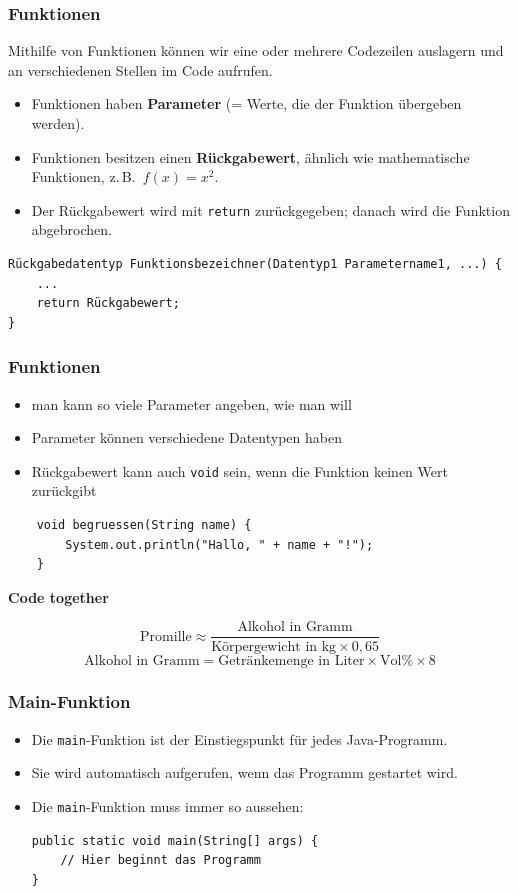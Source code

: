 \documentclass{../../presentation}
\begin{document}
\begin{frame}[fragile]
    \frametitle{Funktionen}
    Mithilfe von Funktionen können wir eine oder mehrere Codezeilen auslagern und an verschiedenen Stellen im Code aufrufen.
    \begin{itemize}
        \item Funktionen haben \textbf{Parameter} (= Werte, die der Funktion übergeben werden).
        \item Funktionen besitzen einen \textbf{Rückgabewert}, ähnlich wie mathematische Funktionen, z.\,B.\ $f(x) = x^2$.
        \item Der Rückgabewert wird mit \texttt{return} zurückgegeben; danach wird die Funktion abgebrochen.
    \end{itemize}
    \begin{verbatim}
Rückgabedatentyp Funktionsbezeichner(Datentyp1 Parametername1, ...) {
    ...
    return Rückgabewert;
}
\end{verbatim}
\end{frame}

\begin{frame}[fragile]
    \frametitle{Funktionen}
    \begin{itemize}
        \item man kann so viele Parameter angeben, wie man will
        \item Parameter können verschiedene Datentypen haben
        \item Rückgabewert kann auch \texttt{void} sein, wenn die Funktion keinen Wert zurückgibt
    \end{itemize}
    \begin{verbatim}
    void begruessen(String name) {
        System.out.println("Hallo, " + name + "!");
    }
    \end{verbatim}
\end{frame}

\begin{frame}[plain]
    \centering
    {\Huge\bfseries{Code together}}
    \begin{block}{}
        \[
            \text{Promille} \approx \frac{\text{Alkohol in Gramm}}{\text{Körpergewicht in kg} \times 0{,}65}
        \]
        \[
            \text{Alkohol in Gramm} = \text{Getränkemenge in Liter} \times \text{Vol\%} \times 8
        \]
    \end{block}
\end{frame}

\begin{frame}[fragile]
    \frametitle{Main-Funktion}
    \begin{itemize}
        \item Die \texttt{main}-Funktion ist der Einstiegspunkt für jedes Java-Programm.
        \item Sie wird automatisch aufgerufen, wenn das Programm gestartet wird.
        \item Die \texttt{main}-Funktion muss immer so aussehen:
              \begin{verbatim}
public static void main(String[] args) {
    // Hier beginnt das Programm
}
\end{verbatim}
    \end{itemize}
\end{frame}
\end{document}
